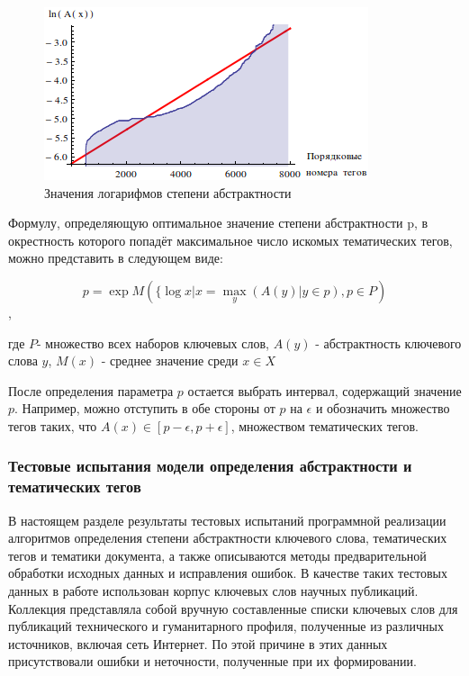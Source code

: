 \begin{figure}[ht]
  \begin{minipage}[ht]{1.0\linewidth}\centering
    \includegraphics[width=0.5\linewidth]{Dissertation/pics/abstract_words_2}
    \caption{Значения логарифмов степени абстрактности}
  \end{minipage}
  \label{img:abst_2}
\end{figure}


Формулу, определяющую оптимальное значение степени абстрактности p, в окрестность которого попадёт максимальное число искомых тематических тегов, можно представить в следующем виде:

$$p=\exp{M(\{\log{x}|x = \underset{y}\max{(A(y)|y\in p), p \in P})}$$,

где $P$- множество всех наборов ключевых слов, $A(y)$ - абстрактность ключевого слова $y$, $M(x)$ - среднее значение среди $x \in X$

После определения параметра $p$ остается выбрать интервал, содержащий значение $p$.  Например, можно отступить в обе стороны от $p$ на $\epsilon$ и обозначить множество тегов таких, что $A(x) \in [p − \epsilon,p + \epsilon]$, множеством тематических тегов.

\subsubsection{Тестовые испытания модели определения абстрактности и тематических тегов} \label{abstr_test}

В настоящем разделе результаты тестовых испытаний программной реализации алгоритмов определения степени абстрактности ключевого слова, тематических тегов и тематики документа, а также описываются методы предварительной обработки исходных данных и исправления ошибок.  В качестве таких тестовых данных в работе использован корпус ключевых слов научных публикаций. Коллекция представляла собой вручную составленные списки ключевых слов для публикаций технического и гуманитарного профиля, полученные из различных источников, включая сеть Интернет. По этой причине в этих данных присутствовали ошибки и неточности, полученные при их формировании.

